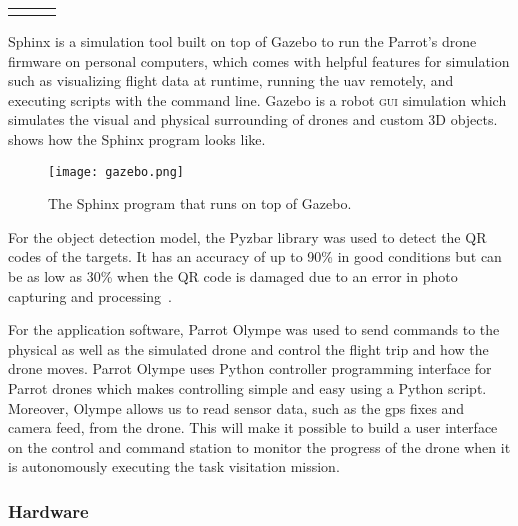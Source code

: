 \documentclass[../main.tex]{subfiles}
\begin{document}
\begin{table}[p]
\begin{tabular}{ p{3cm} p{3cm} p{6cm} }
				\\ 
				\addlinespace				
		
        \bottomrule
    \end{tabular}
\end{table}

Sphinx is a simulation 
tool built on top of Gazebo 
to run the Parrot's drone firmware on 
personal computers, which comes with helpful 
features for simulation such as visualizing flight 
data at runtime, running the \gls{uav} remotely, 
and executing scripts with the command line. 
Gazebo is a robot \textsc{gui} simulation 
which simulates the visual and physical surrounding 
of drones and custom 3D objects. 
 shows how the Sphinx 
program looks like. 

\begin{figure}[tbp]
    \centering
    \texttt{[image: gazebo.png]}
    \caption{The Sphinx program that runs on top of Gazebo.}
    \label{fig:gazebo}
\end{figure}

For the object detection model, the Pyzbar library was used to detect
the QR codes of the targets.
It has an accuracy of up to 90\% in good conditions but can be as
low as 30\% when the QR code is damaged due to an error in photo
capturing and processing~\cite{dynamsoft}.

For the application software, Parrot Olympe 
was used to send commands to the physical as well as 
the simulated drone and control the flight trip and 
how the drone moves. Parrot Olympe uses Python 
controller programming interface for Parrot drones 
which makes controlling simple and easy using a 
Python script. Moreover, Olympe allows us to read
sensor data, such as the \gls{gps} fixes and camera feed, 
from the \anafi
drone. This will make it possible to build a user interface
on the control and command station to monitor 
the progress of the drone
when it is autonomously executing the task visitation
mission.



\subsubsection{Hardware}
\end{document}
